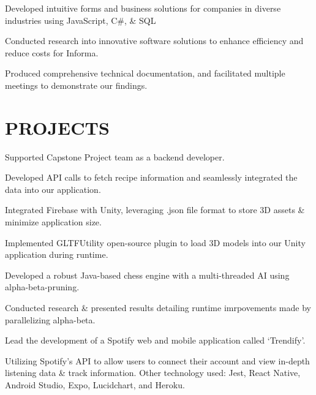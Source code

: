 \documentclass[]{deedy-resume-openfont}
\begin{document}
\begin{tightemize}
\item Developed intuitive forms and business solutions for companies in diverse industries using JavaScript, C\#, \& SQL 
\item Conducted research into innovative software solutions to enhance efficiency and reduce costs for Informa. 
\item Produced comprehensive technical documentation, and facilitated multiple meetings to demonstrate our findings.
\end{tightemize}


\section{PROJECTS}
\begin{tightemize}
\item Supported Capstone Project team as a backend developer. 
\item Developed API calls to fetch recipe information and seamlessly integrated the data into our application. 
\item Integrated Firebase with Unity, leveraging .json file format to store  3D assets \& minimize application size. 
\item Implemented  GLTFUtility open-source plugin to load 3D models into our Unity application during runtime.
\end{tightemize}
\sectionsep

\begin{tightemize}
\item Developed a robust Java-based chess engine with a multi-threaded AI using alpha-beta-pruning. 
\item Conducted research \& presented results detailing runtime imrpovements made by parallelizing alpha-beta.
\end{tightemize}
\sectionsep

\begin{tightemize}
\item Lead the development of a Spotify web and mobile application called ‘Trendify’. 
\item Utilizing Spotify’s API to allow users to connect their account and view in-depth listening data \& track information. Other technology used: Jest, React Native, Android Studio, Expo, Lucidchart, and Heroku.
\end{tightemize}
\end{document}
